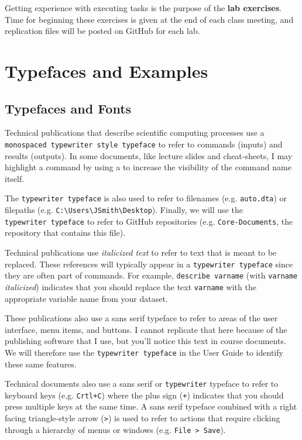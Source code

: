 \documentclass[]{book}
\theoremstyle{definition}
\theoremstyle{definition}
\theoremstyle{remark}
\begin{document}
Getting experience with executing tasks is the purpose of the
\textbf{lab exercises}. Time for beginning these exercises is given at
the end of each class meeting, and replication files will be posted on
GitHub for each lab.

\section{Typefaces and Examples}\label{typefaces-and-examples}

\subsection{Typefaces and Fonts}\label{typefaces-and-fonts}

Technical publications that describe scientific computing processes use
a \texttt{monospaced\ typewriter\ style\ typeface} to refer to commands
(inputs) and results (outputs). In some documents, like lecture slides
and cheat-sheets, I may highlight a command by using a to increase the
visibility of the command name itself.

The \texttt{typewriter\ typeface} is also used to refer to filenames
(e.g. \texttt{auto.dta}) or filepaths (e.g.
\texttt{C:\textbackslash{}Users\textbackslash{}JSmith\textbackslash{}Desktop}).
Finally, we will use the \texttt{typewriter\ typeface} to refer to
GitHub repositories (e.g. \texttt{Core-Documents}, the repository that
contains this file).

Technical publications use \emph{italicized text} to refer to text that
is meant to be replaced. These references will typically appear in a
\texttt{typewriter\ typeface} since they are often part of commands. For
example, \texttt{describe\ varname} (with \texttt{varname}
\emph{italicized}) indicates that you should replace the text
\texttt{varname} with the appropriate variable name from your dataset.

These publications also use a sans serif typeface to refer to areas of
the user interface, menu items, and buttons. I cannot replicate that
here because of the publishing software that I use, but you'll notice
this text in course documents. We will therefore use the
\texttt{typewriter\ typeface} in the User Guide to identify these same
features.

Technical documents also use a sans serif or \texttt{typewriter}
typeface to refer to keyboard keys (e.g. \texttt{Crtl+C}) where the plus
sign (\texttt{+}) indicates that you should press multiple keys at the
same time. A sans serif typeface combined with a right facing
triangle-style arrow (\texttt{\textgreater{}}) is used to refer to
actions that require clicking through a hierarchy of menus or windows
(e.g. \texttt{File\ \textgreater{}\ Save}).
\end{document}
